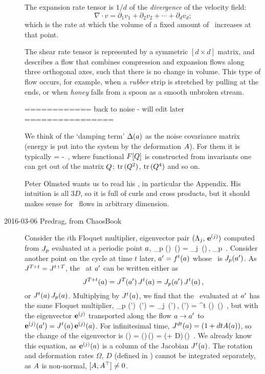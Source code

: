\begin{description}
The expansion rate tensor is $1/d$ of the {\em divergence} of the
velocity field:
\[ \nabla \cdot v = \partial_1 v_1 + \partial_2 v_2
  + \cdots + \partial_d v_d;\]
which is the rate at which the volume of a fixed amount of \statesp\
increases at that point.

The shear rate tensor is represented by a symmetric $[d\times d]$ matrix,
and describes a flow that combines compression and expansion flows along
three orthogonal axes, such that there is no change in volume.  This type
of flow occurs, for example, when a {\em rubber} strip is stretched by
pulling at the ends, or when {\em honey} falls from a spoon as a smooth
unbroken stream.

============ back to noise - will edit later ================

We think of the `damping term' $\diffTen(\ssp)$ as the noise covariance
matrix (energy is put into the system by the deformation $\Mvar$). For
them it is typically
\beq
\diffTen = - \lambda {}
\,,
where functional $F[ \covMat]$ is constructed
from invariants one can get out of the matrix
$ \covMat$; $\tr ( \covMat^2)$,
$\tr ( \covMat^4)$ and so on.

Peter Olmsted wants us to read his , in particular the Appendix.
His intuition is all $3D$, so it is full of curls and cross products, but
it should makes sense for \statesp\ flows in arbitrary dimension.

\item[2016-03-06 Predrag, from ChaosBook]
Consider the $i$th Floquet multiplier, eigen\-vector pair
$(\ExpaEig_{j},\, \jEigvec[j])$ computed from $\jMps_p$
evaluated at a periodic point $\ssp$,
\beq
\jMps_p (\ssp) \,\jEigvec[j](\ssp) =
    \ExpaEig_{j} \,\jEigvec[j](\ssp)\,,  \quad
\ssp \in \pS_p \,.
Consider another point on the cycle at time $t$ later,
$\ssp'=f^t(\ssp)$ whose \FloquetM\ is $\jMps_{p} (\ssp')$.  As
$\jMps^{\period{}+t} = \jMps^{t+\period{}}$,
the \jacobianM\ at $\ssp'$ can be written either as
\[
\jMps^{\period{}+t} (\ssp) = \jMps^{\period{}} (\ssp') \, \jMps^{t} (\ssp)
               = \jMps_p (\ssp') \, \jMps^t (\ssp)
\,,
\]
or
$ %
  \jMps^t (\ssp) \, \jMps_p (\ssp)$.
Multiplying  by $\jMps^t (\ssp)$, we find that the
\FloquetM\ evaluated at $\ssp'$ has the same Floquet multiplier,
\beq
\jMps_p (\ssp') \,\jEigvec[j](\ssp') =
    \ExpaEig_{j} \,\jEigvec[j](\ssp')\,,  \quad
     \jEigvec[j] (\ssp') = \jMps^t (\ssp) \,\jEigvec[j](\ssp)
\,,
but with the eigen\-vector $\jEigvec[j]$ transported along the flow
$\ssp \to \ssp'$ to $\jEigvec[j](\ssp')=\jMps^t(\ssp)
\,\jEigvec[j](\ssp)$. For infinitesimal time, $\jMps^{dt}(\ssp)
= (1+ dt\Mvar(\ssp))$, so the change of the eigenvector is
\beq
{} \jEigvec[j](\ssp) = \Mvar(\ssp)\,\jEigvec[j](\ssp)
= (\Omega + D)\,\jEigvec[j](\ssp)
\,.
We already know this equation, as $\jEigvec[j](\ssp)$ is a column of the
Jacobian $\jMps^t(\ssp)$. The rotation  and deformation rates $\Omega$,
$D$ (defined in \refeq{contLyapRot}) cannot be integrated separately, as
$\Mvar$ is non-normal, $[\Mvar,\transp{\Mvar}] \neq 0$.


\end{description}
